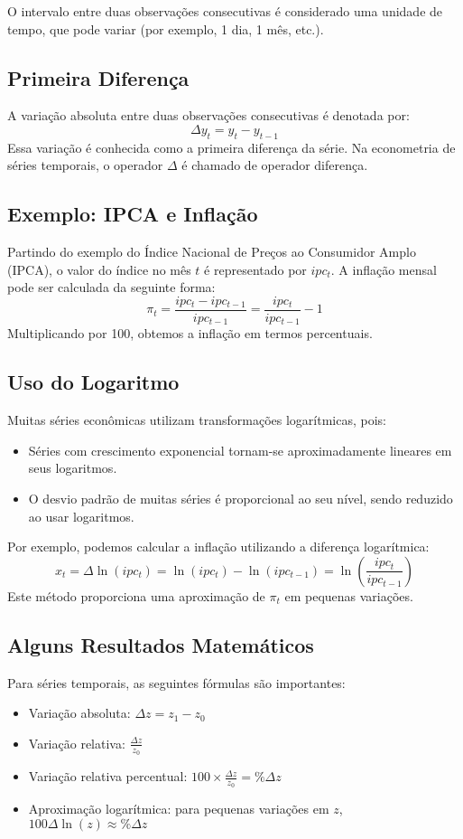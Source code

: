 \documentclass{sciposter}
\begin{document}
\begin{multicols}{3}
O intervalo entre duas observações consecutivas é considerado uma unidade de tempo, que pode variar (por exemplo, 1 dia, 1 mês, etc.).

\subsection{Primeira Diferença}
A variação absoluta entre duas observações consecutivas é denotada por:
\[
\Delta y_t = y_t - y_{t-1}
\]
Essa variação é conhecida como a primeira diferença da série. Na econometria de séries temporais, o operador $\Delta$ é chamado de operador diferença.

\subsection{Exemplo: IPCA e Inflação}
Partindo do exemplo do Índice Nacional de Preços ao Consumidor Amplo (IPCA), o valor do índice no mês $t$ é representado por $ipc_t$. A inflação mensal pode ser calculada da seguinte forma:
\[
\pi_t = \frac{ipc_t - ipc_{t-1}}{ipc_{t-1}} = \frac{ipc_t}{ipc_{t-1}} - 1
\]
Multiplicando por 100, obtemos a inflação em termos percentuais.

\subsection{Uso do Logaritmo}
Muitas séries econômicas utilizam transformações logarítmicas, pois:
\begin{itemize}
    \item Séries com crescimento exponencial tornam-se aproximadamente lineares em seus logaritmos.
    \item O desvio padrão de muitas séries é proporcional ao seu nível, sendo reduzido ao usar logaritmos.
\end{itemize}

Por exemplo, podemos calcular a inflação utilizando a diferença logarítmica:
\[
x_t = \Delta \ln(ipc_t) = \ln(ipc_t) - \ln(ipc_{t-1}) = \ln\left(\frac{ipc_t}{ipc_{t-1}}\right)
\]
Este método proporciona uma aproximação de $\pi_t$ em pequenas variações.

\subsection{Alguns Resultados Matemáticos}
Para séries temporais, as seguintes fórmulas são importantes:
\begin{itemize}
    \item Variação absoluta: $\Delta z = z_1 - z_0$
    \item Variação relativa: $\frac{\Delta z}{z_0}$
    \item Variação relativa percentual: $100 \times \frac{\Delta z}{z_0} = \% \Delta z$
    \item Aproximação logarítmica: para pequenas variações em $z$, $100 \Delta \ln(z) \approx \% \Delta z$
\end{itemize}


\end{multicols}
\end{document}
